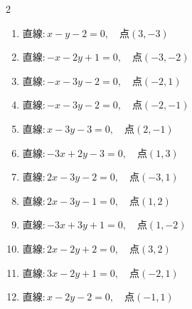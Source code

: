 \begin{multicols}{2}
\begin{enumerate}
  \item $直線:x-y-2=0,\quad 点 ( 3, -3 )$


  \item $直線:-x-2y+1=0,\quad 点 ( -3, -2 )$


  \item $直線:-x-3y-2=0,\quad 点 ( -2, 1 )$


  \item $直線:-x-3y-2=0,\quad 点 ( -2, -1 )$


  \item $直線:x-3y-3=0,\quad 点 ( 2, -1 )$


  \item $直線:-3x+2y-3=0,\quad 点 ( 1, 3 )$

        \phantom{$\displaystyle 距離 : 0$}

  \item $直線:2x-3y-2=0,\quad 点 ( -3, 1 )$


  \item $直線:2x-3y-1=0,\quad 点 ( 1, 2 )$


\columnbreak %

  \item $直線:-3x+3y+1=0,\quad 点 ( 1, -2 )$


  \item $直線:2x-2y+2=0,\quad 点 ( 3, 2 )$


  \item $直線:3x-2y+1=0,\quad 点 ( -2, 1 )$


  \item $直線:x-2y-2=0,\quad 点 ( -1, 1 )$


\end{enumerate}
\end{multicols}
